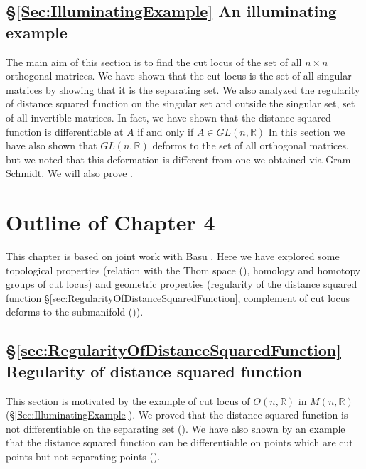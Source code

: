 \subsection*{\S \ref{Sec:IlluminatingExample} An illuminating example}
\hfb The main aim of this section is to find the cut locus of the set of all $n\times n$ orthogonal matrices. We have shown that the cut locus is the set of all singular matrices by showing that it is the separating set. We also analyzed the regularity of distance squared function on the singular set and outside the singular set, set of all invertible matrices. In fact, we have shown that the distance squared function is differentiable at $A$ if and only if $A\in GL(n,\mathbb{R})$ In this section we have also shown that $GL(n,\mathbb{R})$ deforms to the set of all orthogonal matrices, but we noted that this deformation is  different from one we obtained via Gram-Schmidt. We will also prove .

\section{Outline of Chapter 4}
\hfb This chapter is based on joint work with Basu \cite{BaPr21}. Here we have explored some topological properties (relation with the Thom space (), homology and homotopy groups of cut locus) and geometric properties (regularity of the distance squared function \S\ref{sec:RegularityOfDistanceSquaredFunction}, complement of cut locus deforms to the submanifold ()).

\subsection*{\S \ref{sec:RegularityOfDistanceSquaredFunction} Regularity of distance squared function}
\hfb This section is motivated by the example of cut locus of $O(n,\mathbb{R})$ in $M(n,\mathbb{R})$ (\S \ref{Sec:IlluminatingExample}). We proved that the distance squared function is not differentiable on the separating set (). We have also shown by an example that the distance squared function can be differentiable on points which are cut points but not separating points ().

